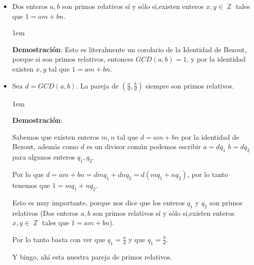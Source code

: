 \documentclass[12pt]{report}                                    %
\newenvironment{SmallIndentation}[1][0.75em]                    %
    {\begin{adjustwidth}{#1}{}\begin{footnotesize}}                 %
    {\end{footnotesize}\end{adjustwidth}}                           %
\DeclareMathOperator \Integers  {\mathbb{Z}}                     %
\begin{document}
            \begin{itemize}

                \item Dos enteros $a,b$ son primos relativos sí y sólo si,existen
                enteros $x,y \in \Integers$ tales que $1=am+bn$.

                    \begin{SmallIndentation}[1em]
                        \textbf{Demostración}:
                            Esto es literalmente un corolario de la Identidad de Bezout,
                            porque si son primos relativos, entonces $GCD(a,b)=1$, y por 
                            la identidad existen $x,y$ tal que $1=am+bn$.

                    \end{SmallIndentation} 


                \item Sea $d=GCD(a,b)$. La pareja de $(\frac{a}{d}, \frac{b}{d})$ siempre son
                primos relativos.

                    \begin{SmallIndentation}[1em]
                        \textbf{Demostración}:

                        Sabemos que existen enteros $m,n$ tal que $d = am+bn$ por la
                        identidad de Bezout, además como $d$ es un divisor común
                        podemos escribir $a=dq_1$ $b=dq_2$ para algunos enteros $q_1,q_2$.

                        Por lo que $d=am+bn = dmq_1 + dnq_2 = d(mq_1 +nq_2)$, por
                        lo tanto tenemos que $1= mq_1 + nq_2$.

                        Esto es muy importante, porque nos dice que los enteros $q_1$ y $q_2$
                        son primos relativos (Dos enteros $a,b$ son primos relativos sí y sólo
                        si,existen enteros $x,y \in \Integers$ tales que $1=am+bn$).

                        Por lo tanto basta con ver que $q_1=\frac{a}{d}$ y que $q_1=\frac{b}{d}$.

                        Y bingo, ahí esta nuestra pareja de primos relativos.

                    \end{SmallIndentation} 

            \end{itemize}
\end{document}
